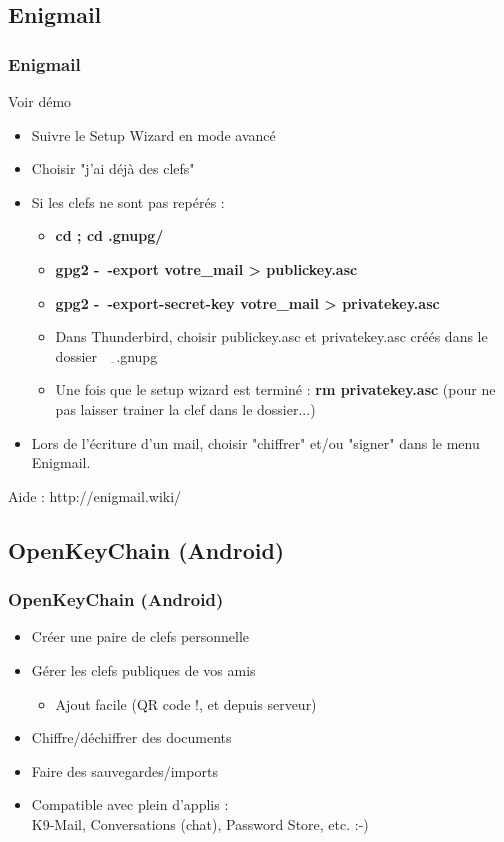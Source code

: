 \documentclass{beamer}
\begin{document}
\subsection{Enigmail}


\begin{frame}
\frametitle{Enigmail}
    Voir démo\\
    \begin{itemize}
    \item Suivre le Setup Wizard en mode avancé 
    \item Choisir "j'ai déjà des clefs"
    \item Si les clefs ne sont pas repérés :
    	\begin{itemize}
    	\item \textbf{cd ; cd .gnupg/}
    	\item \textbf{gpg2 -~-export votre\_mail >  publickey.asc}
    	\item \textbf{gpg2 -~-export-secret-key votre\_mail >  privatekey.asc}
    	\item Dans Thunderbird, choisir publickey.asc et privatekey.asc créés dans le dossier ~ $_{\widetilde{~}}$.gnupg
    	\item Une fois que le setup wizard est terminé : \textbf{rm privatekey.asc} (pour ne pas laisser trainer la clef dans le dossier...)
    	\end{itemize}
   \item Lors de l'écriture d'un mail, choisir "chiffrer" et/ou "signer" dans le menu Enigmail.
  	
    \end{itemize}
    Aide : http://enigmail.wiki/ 
 \end{frame}
 
\subsection{OpenKeyChain (Android)}

\begin{frame}
\frametitle{OpenKeyChain (Android)}
\begin{itemize}
    \item Créer une paire de clefs personnelle 
    \item Gérer les clefs publiques de vos amis 
    \begin{itemize}
    \item Ajout facile (QR code !, et depuis serveur) 
    \end{itemize}
    \item Chiffre/déchiffrer des documents 
    \item Faire des sauvegardes/imports
    \item  Compatible avec plein d'applis : \\
    K9-Mail, Conversations (chat), Password Store, etc. :-)
  \end{itemize}
\end{frame}
\end{document}
